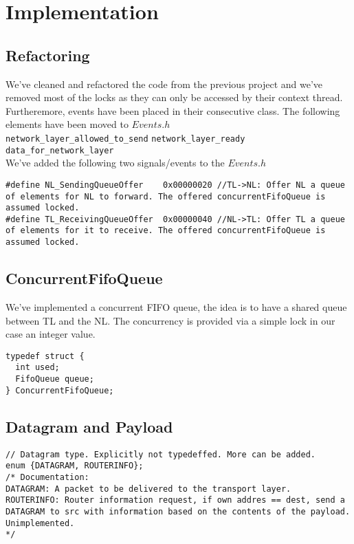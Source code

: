 \section{Implementation}

\subsection{Refactoring}

We've cleaned and refactored the code from the previous project and we've removed most of the locks as they can only be accessed by their context thread.
Furtheremore, events have been placed in their consecutive class.
The following elements have been moved to $Events.h$
\break
\\
\texttt{network\_layer\_allowed\_to\_send}
\break
\texttt{network\_layer\_ready}
\break
\texttt{data\_for\_network\_layer}
\\

We've added the following two signals/events to the $Events.h$

\begin{lstlisting}
#define NL_SendingQueueOffer    0x00000020 //TL->NL: Offer NL a queue of elements for NL to forward. The offered concurrentFifoQueue is assumed locked.
#define TL_ReceivingQueueOffer  0x00000040 //NL->TL: Offer TL a queue of elements for it to receive. The offered concurrentFifoQueue is assumed locked.
\end{lstlisting}


\subsection{ConcurrentFifoQueue}

We've implemented a concurrent FIFO queue, the idea is to have a shared queue between TL and the NL.
The concurrency is provided via a simple lock in our case an integer value.
\begin{lstlisting}
typedef struct {
  int used;
  FifoQueue queue;
} ConcurrentFifoQueue;
\end{lstlisting}



\subsection{Datagram and Payload}

\begin{lstlisting}
// Datagram type. Explicitly not typedeffed. More can be added.
enum {DATAGRAM, ROUTERINFO};
/* Documentation:
DATAGRAM: A packet to be delivered to the transport layer.
ROUTERINFO: Router information request, if own addres == dest, send a DATAGRAM to src with information based on the contents of the payload. Unimplemented.
*/
\end{lstlisting}


